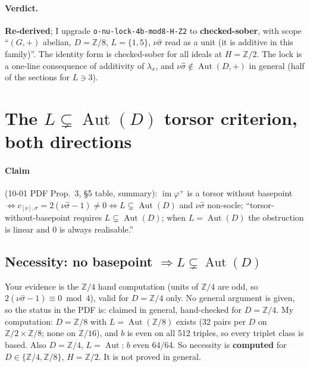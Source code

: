 \documentclass[11pt]{article}
\newcommand{\Z}{\mathbb{Z}}
\newcommand{\Aut}{\operatorname{Aut}}
\newcommand{\im}{\operatorname{im}}
\newcommand{\sh}{\hat\sigma}
\begin{document}
\paragraph{Verdict.} \textbf{Re-derived}; I upgrade \texttt{o-nu-lock-4b-mod8-H-Z2} to
\textbf{checked-sober}, with scope ``$(G,+)$ abelian, $D=\Z/8$, $L=\{1,5\}$, $\nu\sh$ read
as a unit (it is additive in this family)''. The identity form is checked-sober for all
ideals at $H=\Z/2$. The lock is a one-line consequence of additivity of $\lambda_x$, and
$\nu\sh\notin\Aut(D,+)$ in general (half of the sections for $L\ni3$).

\section{The $L\subsetneq\Aut(D)$ torsor criterion, both directions}

\paragraph{Claim} (10-01 PDF Prop.~3, \S5 table, summary): $\im\varphi^+$ is a torsor
without basepoint $\iff c_{[\nu],\sigma}=2(\nu\sh-1)\neq0\iff L\subsetneq\Aut(D)$ and
$\nu\sh$ non-socle; ``torsor-without-basepoint requires $L\subsetneq\Aut(D)$; when
$L=\Aut(D)$ the obstruction is linear and 0 is always realisable.''

\subsection*{Necessity: no basepoint $\Rightarrow L\subsetneq\Aut(D)$}
Your evidence is the $\Z/4$ hand computation (units of $\Z/4$ are odd, so
$2(\nu\sh-1)\equiv0\bmod4$), valid for $D=\Z/4$ only. No general argument is given, so
the status in the PDF is: claimed in general, hand-checked for $D=\Z/4$.
My computation: $D=\Z/8$ with $L=\Aut(\Z/8)$ exists (32 pairs per $D$ on $\Z/2\times\Z/8$;
none on $\Z/16$), and $b$ is even on all 512 triples, so every triplet class is based.
Also $D=\Z/4$, $L=\Aut$: $b$ even 64/64. So necessity is \textbf{computed} for
$D\in\{\Z/4,\Z/8\}$, $H=\Z/2$. It is not proved in general.
\end{document}
